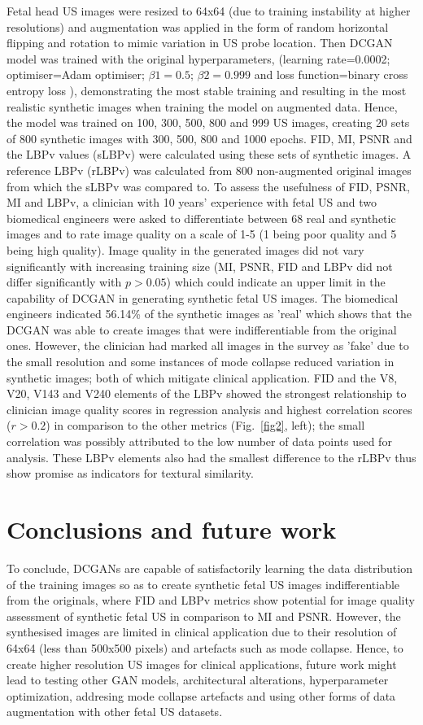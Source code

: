 \documentclass[runningheads]{llncs}
\begin{document}
Fetal head US images were resized to 64x64 (due to training instability at higher resolutions) and augmentation was applied in the form of random horizontal flipping and rotation to mimic variation in US probe location.
Then DCGAN model was trained with the original hyperparameters, (learning rate=0.0002; optimiser=Adam optimiser; $\beta1=0.5$; $\beta2= 0.999$ and loss function=binary cross entropy loss  \cite{radford2016unsupervised}), demonstrating the most stable training and resulting in the most realistic synthetic images when training the model on augmented data.
Hence, the model was trained on 100, 300, 500, 800 and 999 US images, creating 20 sets of 800 synthetic images with 300, 500, 800 and 1000 epochs.
FID, MI, PSNR and the LBPv values (sLBPv) were calculated using these sets of synthetic images.
A reference LBPv (rLBPv) was calculated from 800 non-augmented original images from which the sLBPv was compared to.
To assess the usefulness of FID, PSNR, MI and LBPv, a clinician with 10 years' experience with fetal US and two biomedical engineers were asked to differentiate between 68 real and synthetic images and to rate image quality on a scale of 1-5 (1 being poor quality and 5 being high quality).
Image quality in the generated images did not vary significantly with increasing training size (MI, PSNR, FID and LBPv did not differ significantly with $p>0.05$) which could indicate an upper limit in the capability of DCGAN in generating synthetic fetal US images.
The biomedical engineers indicated 56.14\% of the synthetic images as 'real' which shows that the DCGAN was able to create images that were indifferentiable from the original ones.
However, the clinician had marked all images in the survey as 'fake' due to the small resolution and some instances of mode collapse reduced variation in synthetic images; both of which mitigate clinical application.
FID and the V8, V20, V143 and V240 elements of the LBPv showed the strongest relationship to clinician image quality scores in regression analysis and highest correlation scores ($r>0.2$) in comparison to the other metrics (Fig.~\ref{fig2}, left); the small correlation was possibly attributed to the low number of data points used for analysis. These LBPv elements also had the smallest difference to the rLBPv thus show promise as indicators for textural similarity.


\section{Conclusions and future work}
To conclude, DCGANs are capable of satisfactorily learning the data distribution of the training images so as to create synthetic fetal US images indifferentiable from the originals, where FID and LBPv metrics show potential for image quality assessment of synthetic fetal US in comparison to MI and PSNR.
However, the synthesised images are limited in clinical application due to their resolution of 64x64 (less than 500x500 pixels) and artefacts such as mode collapse.
Hence, to create higher resolution US images for clinical applications, future work might lead to testing other GAN models, architectural alterations, hyperparameter optimization, addresing mode collapse artefacts and using other forms of data augmentation with other fetal US datasets.
\end{document}
